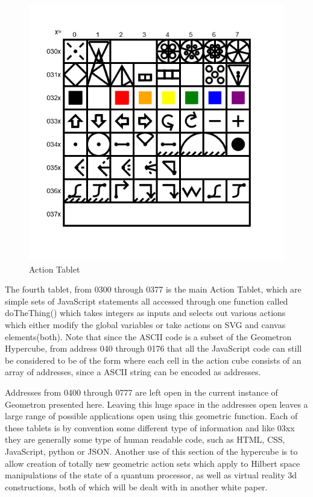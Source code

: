 \documentclass[11pt]{article}
\begin{document}
\begin{figure}

\includegraphics[width=\linewidth]{figures/figure6_actionTablet.png}

\caption{Action Tablet}
\end{figure}

    The fourth tablet, from 0300 through 0377 is the main Action Tablet, which are simple sets of JavaScript statements all accessed through one function called doTheThing() which takes integers as inputs and selects out various actions which either modify the global variables or take actions on SVG and canvas elements(both).  Note that since the ASCII code is a subset of the Geometron Hypercube, from address 040 through 0176 that all the JavaScript code can still be considered to be of the form where each cell in the action cube consists of an array of addresses, since a ASCII string can be encoded as addresses.  

    Addresses from 0400 through 0777 are left open in the current instance of Geometron presented here. Leaving this huge space in the addresses open leaves a large range of possible applications open using this geometric function.  Each of these tablets is by convention some different type of information and like 03xx they are generally some type of human readable code, such as HTML, CSS, JavaScript, python or JSON.  Another use of this section of the hypercube is to allow creation of totally new geometric action sets which apply to Hilbert space manipulations of the state of a quantum processor, as well as virtual reality 3d constructions, both of which will be dealt with in another white paper. 
\end{document}
